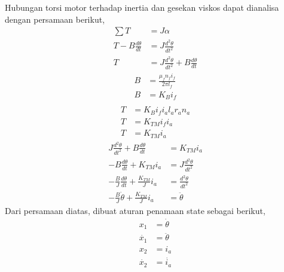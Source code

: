 \documentclass[../main.tex]{subfiles}
\begin{document}
                Hubungan torsi motor terhadap inertia dan gesekan viskos dapat dianalisa dengan persamaan berikut,
                \begin{equation}
                    \begin{split}
                        \sum T &= J\alpha \\[5pt]
                        T - B\frac{d\theta}{dt} &= J\frac{d^2\theta}{dt^2} \\[5pt]
                        T &= J\frac{d^2\theta}{dt^2} + B\frac{d\theta}{dt}
                    \end{split}
                \end{equation}
                \begin{equation}
                    \begin{split}
                        B &= \frac{\mu_f n_f i_f}{2\pi l_f} \\[5pt]
                        B &= K_B i_f \\[5pt]
                    \end{split}
                \end{equation}
                \begin{equation}
                    \begin{split}
                        T &= K_B i_f i_a l_a r_a n_a \\[5pt]
                        T &= K_{TM} i_f i_a \\[5pt]
                        T &= K_{TM} i_a
                    \end{split}
                \end{equation}
                \begin{equation}
                    \begin{split}
                        J\frac{d^2\theta}{dt^2} + B\frac{d\theta}{dt} &= K_{TM} i_a \\[5pt]
                        -B \frac{d\theta}{dt} + K_{TM}i_a &= J\frac{d^2\theta}{dt^2} \\[5pt]
                        -\frac{B}{J}\frac{d\theta}{dt} + \frac{K_{TM}}{J}i_a &= \frac{d^2\theta}{dt^2} \\[5pt]
                        -\frac{B}{J}\dot{\theta} + \frac{K_{TM}}{J}i_a &= \ddot{\theta}
                    \end{split}
                \end{equation}
                Dari persamaan diatas, dibuat aturan penamaan state sebagai berikut,
                \begin{equation}
                \begin{split}
                    x_1 &= \dot{\theta} \\[5pt]
                    \dot{x_1} &= \ddot{\theta} \\[5pt]
                    x_2 &= i_a \\[5pt]
                    \dot{x_2} &= \dot{i_a}
                    \label{persamaan_17}
                \end{split}
                \end{equation}
\end{document}
